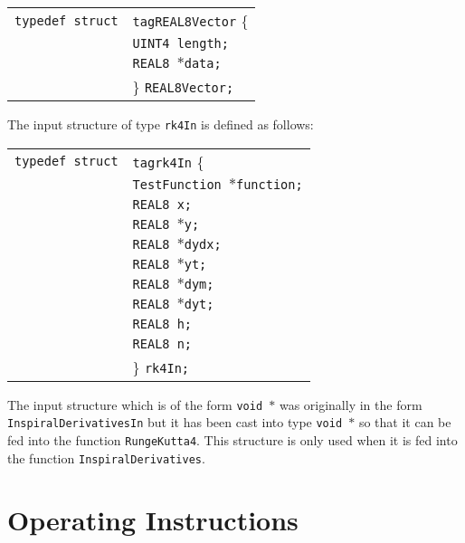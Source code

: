 \documentclass[12pt]{article}
\begin{document}
\begin{tabular}{ll}
\texttt{typedef struct} & \texttt{tagREAL8Vector} \{ \\
                        & \texttt{UINT4 length;} \\
                        & \texttt{REAL8 $\ast$data;}  \\
                        & \} \texttt{REAL8Vector;}
\end{tabular}

\vspace{5mm}

The input structure of type \texttt{rk4In} is defined as follows:

\begin{tabular}{ll}
\texttt{typedef struct} & \texttt{tagrk4In} \{ \\
                        & \texttt{TestFunction $\ast$function;} \\
                        & \texttt{REAL8 x;}  \\
                        & \texttt{REAL8 $\ast$y;}  \\
                        & \texttt{REAL8 $\ast$dydx;}  \\
                        & \texttt{REAL8 $\ast$yt;}  \\
                        & \texttt{REAL8 $\ast$dym;}  \\
                        & \texttt{REAL8 $\ast$dyt;}  \\
                        & \texttt{REAL8 h;}  \\
                        & \texttt{REAL8 n;}  \\
                        & \} \texttt{rk4In;}
\end{tabular}


The input structure which is of the form \texttt{void $\ast$} was originally in the form \texttt{InspiralDerivativesIn} but it has been cast into type \texttt{void $\ast$} so that it can be fed into the function \texttt{RungeKutta4}. This structure is only used when it is fed into the function \texttt{InspiralDerivatives}.









\section{Operating Instructions}
\end{document}
